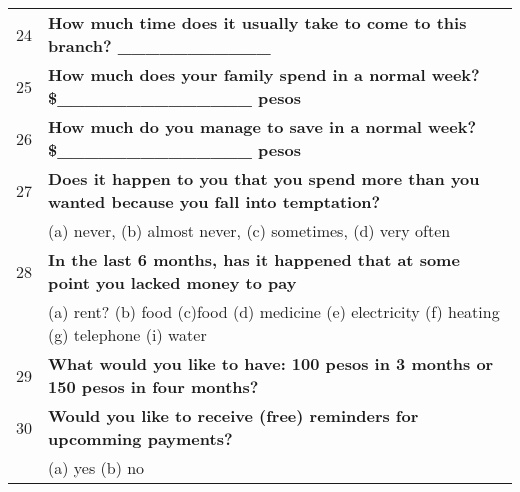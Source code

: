 \begin{tabular}{cl}
24    & \textbf{How much time does it usually take to come to this branch?    \_\_\_\_\_\_\_\_\_\_\_} \\
25    & \textbf{How much does your family spend in a normal week?   \$\_\_\_\_\_\_\_\_\_\_\_\_\_\_ pesos} \\
26    & \textbf{How much do you manage to save in a normal week?   \$\_\_\_\_\_\_\_\_\_\_\_\_\_\_ pesos} \\
27    & \textbf{Does it happen to you that you spend more than you wanted because you fall into temptation?} \\
      & (a) never, (b) almost never, (c) sometimes, (d) very often \\
28    & \textbf{In the last 6 months, has it happened that at some point you lacked money to pay} \\
      & (a) rent?    (b) food    (c)food   (d) medicine  (e) electricity   (f) heating   (g) telephone    (i) water \\
29    & \textbf{What would you like to have: 100 pesos in 3 months or 150 pesos in four months?} \\
30    & \textbf{Would you like to receive (free) reminders for upcomming payments?} \\
      & (a) yes  (b) no \\
\bottomrule
\end{tabular}%
